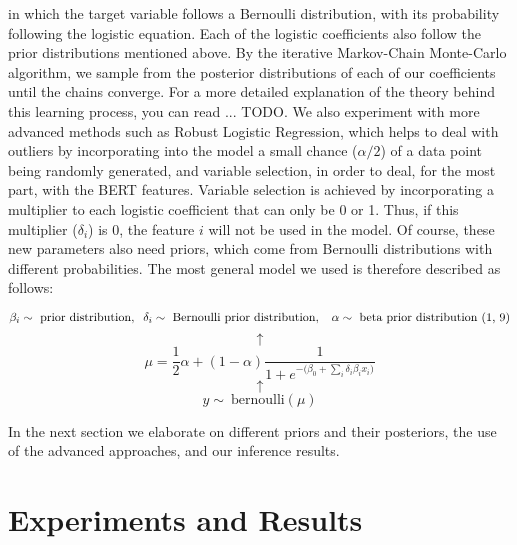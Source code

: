 \documentclass[man, floatsintext, 10pt]{apa6}
\begin{document}
in which the target variable follows a Bernoulli distribution, with its probability following the logistic equation. Each of the logistic coefficients also follow the prior distributions mentioned above. By the iterative Markov-Chain Monte-Carlo algorithm, we sample from the posterior distributions of each of our coefficients until the chains converge. For a more detailed explanation of the theory behind this learning process, you can read ... TODO.  We also experiment with more advanced methods such as Robust Logistic Regression, which helps to deal with outliers by incorporating into the model a small chance ($\alpha/2$) of a data point being randomly generated, and variable selection, in order to deal, for the most part, with the BERT features. Variable selection is achieved by incorporating a multiplier to each logistic coefficient that can only be 0 or 1. Thus, if this multiplier ($\delta_i$) is 0, the feature $i$ will not be used in the model. Of course, these new parameters also need priors, which come from Bernoulli distributions with different probabilities. The most general model we used is therefore described as follows:

 \[\beta_i \sim \text{ prior distribution}, \hspace{2mm} \delta_i \sim \text{ Bernoulli prior distribution}, \hspace{2mm}\  \alpha \sim \text{ beta prior distribution (1, 9)} \] \[ \uparrow \] \[ \mu = \frac{1}{2} \alpha + (1 - \alpha) \frac{1}{1 + e^{-\big(\beta_0 + \sum_i \delta_i \beta_i x_i \big)}} \] \vspace{0.01mm}  \[ \uparrow \] \[ y \sim\ \text{bernoulli} (\mu) \]
 
In the next section we elaborate on different priors and their posteriors, the use of the advanced approaches, and our inference results.

\section{Experiments and Results}
\end{document}
